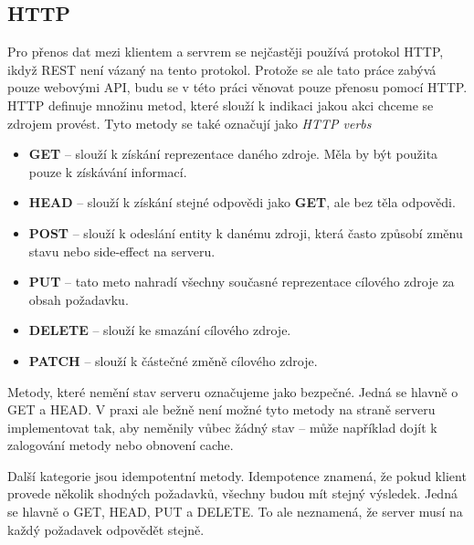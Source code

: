 \documentclass[thesis=M,czech]{FITthesis}[2019/12/23]
\begin{document}
\subsection{HTTP}
Pro přenos dat mezi klientem a servrem se nejčastěji používá protokol HTTP, ikdyž REST není vázaný na tento protokol. Protože se ale tato práce zabývá pouze webovými API, budu se v této práci věnovat pouze přenosu pomocí HTTP.
HTTP definuje množinu metod, které slouží k indikaci jakou akci chceme se zdrojem provést. Tyto metody se také označují jako \textit{HTTP verbs} \cite{http_metods}

\begin{itemize}
    \item \textbf{GET} -- slouží k získání reprezentace daného zdroje. Měla by být použita pouze k získávání informací.
    \item \textbf{HEAD} -- slouží k získání stejné odpovědi jako \textbf{GET}, ale bez těla odpovědi.
    \item \textbf{POST} -- slouží k odeslání entity k danému zdroji, která často způsobí změnu stavu nebo side-effect na serveru.
    \item \textbf{PUT} -- tato meto nahradí všechny současné reprezentace cílového zdroje za obsah požadavku.
    \item \textbf{DELETE} -- slouží ke smazání cílového zdroje.
    \item \textbf{PATCH} -- slouží k částečné změně cílového zdroje.
\end{itemize}

Metody, které nemění stav serveru označujeme jako bezpečné. Jedná se hlavně o GET a HEAD. V praxi ale bežně není možné tyto metody na straně serveru implementovat tak, aby neměnily vůbec žádný stav -- může například dojít k zalogování metody nebo obnovení cache.

Další kategorie jsou idempotentní metody. Idempotence znamená, že pokud klient provede několik shodných požadavků, všechny budou mít stejný výsledek. Jedná se hlavně o GET, HEAD, PUT a DELETE. To ale neznamená, že server musí na každý požadavek odpovědět stejně.
\end{document}
